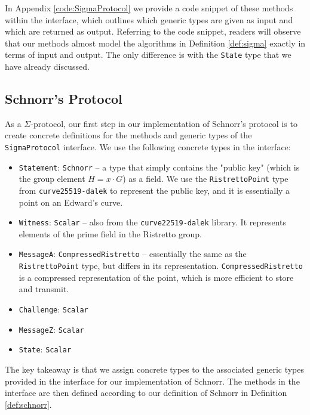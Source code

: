 In Appendix \ref{code:SigmaProtocol} we provide a code snippet of these methods within 
the interface, which outlines which generic types are given as input and which are 
returned as output. Referring to the code snippet, readers will observe that our 
methods almost model the algorithms in Definition \ref{def:sigma} exactly in terms of 
input and output. The only difference is with the \texttt{State} type that we have already 
discussed.

\subsection{Schnorr's Protocol}
As a $\Sigma$-protocol, our first step in our implementation of Schnorr's protocol is 
to create concrete definitions for 
the methods and generic types of the \texttt{SigmaProtocol} interface. We use the following 
concrete types in the interface: 
\begin{itemize}
  \item \texttt{Statement}: \texttt{Schnorr} -- a type that simply contains the "public key"
  (which is the group element $H = x \cdot G$) as a field. We use the \texttt{RistrettoPoint} 
  type from \texttt{curve25519-dalek} to represent the public key, and it is essentially a 
  point on an Edward's curve. 
  \item \texttt{Witness}: \texttt{Scalar} -- also from the \texttt{curve22519-dalek} library. It 
  represents elements of the prime field in the Ristretto group. 
  \item \texttt{MessageA}: \texttt{CompressedRistretto} -- essentially the same as the 
  \texttt{RistrettoPoint} type, but differs in its representation. \texttt{CompressedRistretto}
  is a compressed representation of the point, which is more efficient to store and
  transmit.
  \item \texttt{Challenge}: \texttt{Scalar}
  \item \texttt{MessageZ}: \texttt{Scalar}
  \item \texttt{State}: \texttt{Scalar} 
\end{itemize}

The key takeaway is that we assign concrete types to the associated generic types provided in 
the interface for our implementation of Schnorr. The methods in the interface are then 
defined according to our definition of Schnorr in Definition \ref{def:schnorr}. 